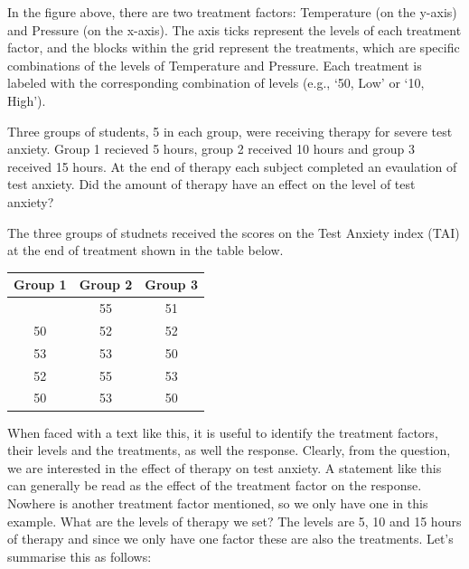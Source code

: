 \documentclass[
  letterpaper,
  DIV=11,
  numbers=noendperiod,
  oneside]{scrreprt}
\begin{document}
In the figure above, there are two treatment factors: Temperature (on
the y-axis) and Pressure (on the x-axis). The axis ticks represent the
levels of each treatment factor, and the blocks within the grid
represent the treatments, which are specific combinations of the levels
of Temperature and Pressure. Each treatment is labeled with the
corresponding combination of levels (e.g., `50, Low' or `10, High').

\begin{tcolorbox}[enhanced jigsaw, colframe=quarto-callout-warning-color-frame, breakable, arc=.35mm, toptitle=1mm, colback=white, title={Example 1}, opacityback=0, bottomrule=.15mm, opacitybacktitle=0.6, colbacktitle=quarto-callout-warning-color!10!white, toprule=.15mm, rightrule=.15mm, bottomtitle=1mm, leftrule=.75mm, titlerule=0mm, coltitle=black, left=2mm]

Three groups of students, 5 in each group, were receiving therapy for
severe test anxiety. Group 1 recieved 5 hours, group 2 received 10 hours
and group 3 received 15 hours. At the end of therapy each subject
completed an evaulation of test anxiety. Did the amount of therapy have
an effect on the level of test anxiety?

The three groups of studnets received the scores on the Test Anxiety
index (TAI) at the end of treatment shown in the table below.

\begin{longtable}[]{@{}ccc@{}}
\toprule\noalign{}
Group 1 & Group 2 & Group 3 \\
\midrule\noalign{}
\endhead
\bottomrule\noalign{}
\endlastfoot
48 & 55 & 51 \\
50 & 52 & 52 \\
53 & 53 & 50 \\
52 & 55 & 53 \\
50 & 53 & 50 \\
\end{longtable}

\hfill\break

\end{tcolorbox}

When faced with a text like this, it is useful to identify the treatment
factors, their levels and the treatments, as well the response. Clearly,
from the question, we are interested in the effect of therapy on test
anxiety. A statement like this can generally be read as the effect of
the treatment factor on the response. Nowhere is another treatment
factor mentioned, so we only have one in this example. What are the
levels of therapy we set? The levels are 5, 10 and 15 hours of therapy
and since we only have one factor these are also the treatments. Let's
summarise this as follows:
\end{document}
